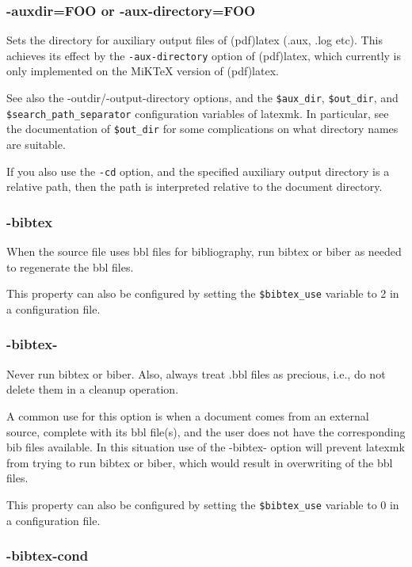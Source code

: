 \subsubsection{-auxdir=FOO or -aux-directory=FOO}

Sets  the  directory  for  auxiliary  output files of (pdf)latex
(.aux, .log etc).  This achieves its effect by  the
\verb|-aux-directory|  option  of (pdf)latex, which currently is only implemented
on the MiKTeX version of (pdf)latex.

See  also  the  -outdir/-output-directory   options,   and   the
\verb|$aux_dir|,  \verb|$out_dir|,  and  \verb|$search_path_separator|
configuration variables of latexmk.  In particular, see the  documentation  of
\verb|$out_dir|  for  some  complications  on  what directory names are suitable.

If you also use the \verb|-cd| option, and the specified auxiliary output
directory  is a relative path, then the path is interpreted relative to the
document directory.


\subsubsection{-bibtex}

When the source file uses bbl files for bibliography, run bibtex or biber as
needed to regenerate the bbl files.

This  property can also be configured by setting the \verb|$bibtex_use| variable to 2
in a configuration file.

\subsubsection{-bibtex-}

Never run bibtex or biber.  Also, always  treat  .bbl  files  as
precious, i.e., do not delete them in a cleanup operation.

A  common  use  for this option is when a document comes from an external
source, complete with its bbl  file(s),  and  the  user does  not  have  the
corresponding bib files available.  In this situation use of the -bibtex-
option will prevent  latexmk  from trying to run bibtex or biber, which would
result in overwriting of the bbl files.

This property can also be configured by setting the  \verb|$bibtex_use| variable to 0
in a configuration file.

\subsubsection{-bibtex-cond}

